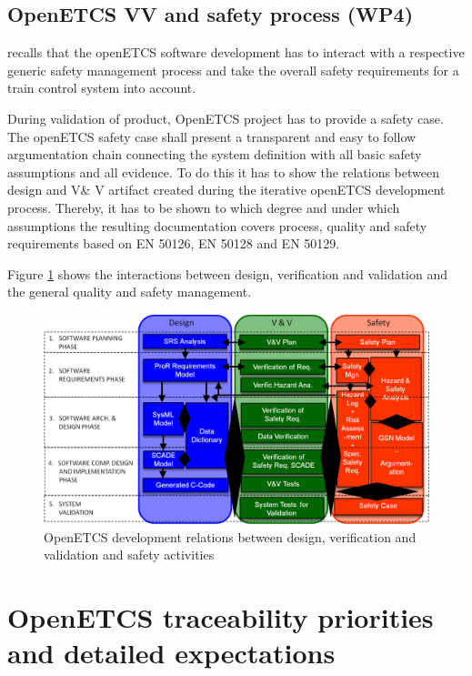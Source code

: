 \documentclass[11pt]{template/openetcs_report}
\begin{document}
\section{OpenETCS VV and safety process (WP4)}


\cite{D4.2.3} recalls that the openETCS software development has to interact with a respective generic safety management process and take the overall safety requirements for a train control system into account. 

During validation of product, OpenETCS project has to provide a safety case. 
The openETCS safety case shall present a transparent and easy to follow argumentation chain
connecting the system definition with all basic safety assumptions and all evidence. To do this it
has to show the relations between design and V\& V artifact created during the iterative openETCS
development process. Thereby, it has to be shown to which degree and under which assumptions
the resulting documentation covers process, quality and safety requirements based on EN 50126,
EN 50128 and EN 50129.

Figure \ref{fig:SafetyProcess} shows the interactions between design, verification and validation and the general quality and safety management.

\begin{figure}[htbp]
\centering
\includegraphics[width=1\linewidth]{./images/openETCS-Software-Safety-Development.png}
\caption{OpenETCS development relations between design, verification and validation and safety activities}
\label{fig:SafetyProcess}
\end{figure}




\chapter{OpenETCS traceability priorities and detailed expectations}
\end{document}
